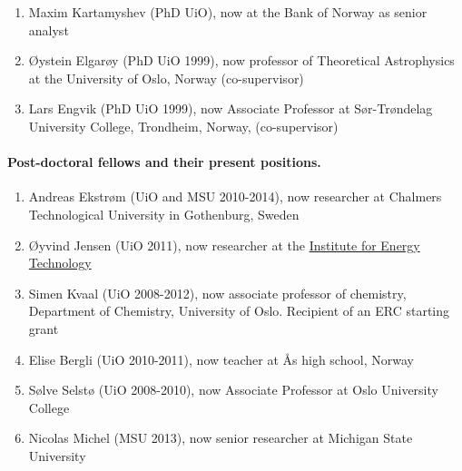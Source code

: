 \documentclass[%
oneside,                 %
final,                   %
10pt]{article}
\begin{document}
\begin{enumerate}
\item Maxim Kartamyshev (PhD UiO), now at the Bank of Norway as senior analyst

\item Øystein Elgarøy (PhD UiO 1999), now professor of Theoretical Astrophysics at the University of Oslo, Norway (co-supervisor)

\item Lars Engvik (PhD UiO 1999), now Associate Professor at Sør-Trøndelag University College, Trondheim, Norway, (co-supervisor)
\end{enumerate}

\noindent
\paragraph{Post-doctoral fellows and their present positions.}
\begin{enumerate}
\item Andreas Ekstrøm (UiO and MSU 2010-2014), now researcher at Chalmers Technological University in Gothenburg, Sweden

\item Øyvind Jensen (UiO 2011), now researcher at the \href{{https://www.ife.no/en}}{Institute for Energy Technology}

\item Simen Kvaal (UiO 2008-2012), now associate professor of chemistry, Department of Chemistry, University of Oslo. Recipient of an ERC starting grant

\item Elise Bergli (UiO 2010-2011), now teacher at Ås high school, Norway

\item Sølve Selstø (UiO 2008-2010), now Associate Professor at Oslo University College 

\item Nicolas Michel (MSU 2013), now senior researcher at Michigan State University
\end{enumerate}

\noindent
\end{document}
